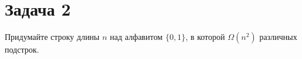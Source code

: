 \section{Задача 2}
Придумайте строку длины $n$ над алфавитом $\{0, 1\}$, в которой $\Omega(n^2)$ различных подстрок.

